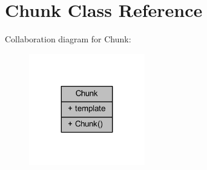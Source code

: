 \hypertarget{class_chunk}{}\section{Chunk Class Reference}
\label{class_chunk}


Collaboration diagram for Chunk\+:
\nopagebreak
\begin{figure}[H]
\begin{center}
\leavevmode
\includegraphics[width=143pt]{class_chunk__coll__graph}
\end{center}
\end{figure}

